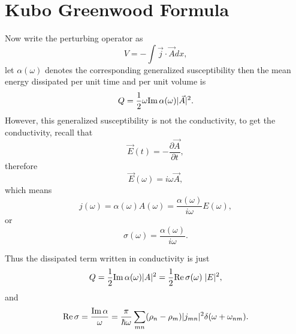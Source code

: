 \documentclass{book}
\renewcommand{\Re}{{\rm Re}}
\renewcommand{\Im}{{\rm Im}}
\numberwithin{equation}{section}
\begin{document}
\section{Kubo Greenwood Formula}
Now write the perturbing operator as
\begin{equation}
  V=-\int\vec{j}\cdot\vec{A}dx,
\end{equation}
let $\alpha(\omega)$ denotes the corresponding generalized
susceptibility then the mean energy dissipated per unit time and per
unit volume is
\begin{equation}
  Q=\frac{1}{2}\omega\Im\,\alpha(\omega)|\vec{A}|^2.
\end{equation}
However, this generalized susceptibility is not the conductivity, to
get the conductivity, recall that
\begin{equation}
  \vec{E}(t)=-\frac{\partial\vec{A}}{\partial t},
\end{equation}
therefore
\begin{equation}
  \vec{E}(\omega)=i\omega\vec{A},
\end{equation}
which means
\begin{equation}
  j(\omega)=\alpha(\omega)A(\omega)=\frac{\alpha(\omega)}{i\omega}E(\omega),
\end{equation}
or
\begin{equation}
  \sigma(\omega)=\frac{\alpha(\omega)}{i\omega}.
\end{equation}

Thus the dissipated term written in conductivity is just
\begin{equation}
  Q=\frac{1}{2}\Im\,\alpha(\omega)|A|^2=\frac{1}{2}\Re\,\sigma(\omega)\;|E|^2,
\end{equation}
and
\begin{equation}
  \Re\,\sigma=\frac{\Im\,\alpha}{\omega}=
  \frac{\pi}{\hbar\omega}\sum_{mn}(\rho_n-\rho_m)
  |j_{mn}|^2\delta(\omega+\omega_{nm}).
\end{equation}
\end{document}
